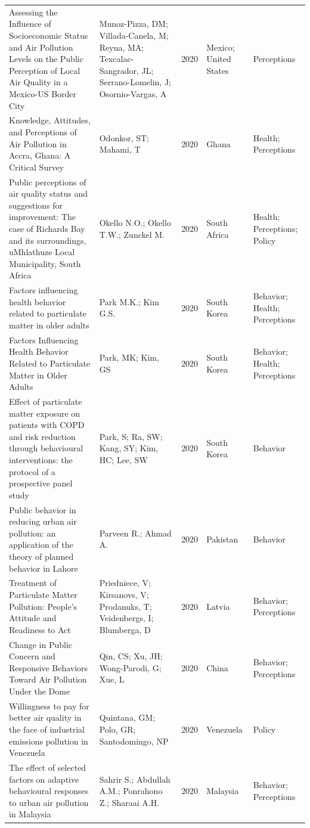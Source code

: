 {\begin{longtable}[t]{p{6cm}p{3cm}lp{3cm}p{3cm}}
Assessing the Influence of Socioeconomic Status and Air Pollution Levels on the Public Perception of Local Air Quality in a Mexico-US Border City & Munoz-Pizza, DM; Villada-Canela, M; Reyna, MA; Texcalac-Sangrador, JL; Serrano-Lomelin, J; Osornio-Vargas, A & 2020 & Mexico; United States & Perceptions\\
Knowledge, Attitudes, and Perceptions of Air Pollution in Accra, Ghana: A Critical Survey & Odonkor, ST; Mahami, T & 2020 & Ghana & Health; Perceptions\\
Public perceptions of air quality status and suggestions for improvement: The case of Richards Bay and its surroundings, uMhlathuze Local Municipality, South Africa & Okello N.O.; Okello T.W.; Zunckel M. & 2020 & South Africa & Health; Perceptions; Policy\\
Factors influencing health behavior related to particulate matter in older adults & Park M.K.; Kim G.S. & 2020 & South Korea & Behavior; Health; Perceptions\\
\addlinespace
Factors Influencing Health Behavior Related to Particulate Matter in Older Adults & Park, MK; Kim, GS & 2020 & South Korea & Behavior; Health; Perceptions\\
Effect of particulate matter exposure on patients with COPD and risk reduction through behavioural interventions: the protocol of a prospective panel study & Park, S; Ra, SW; Kang, SY; Kim, HC; Lee, SW & 2020 & South Korea & Behavior\\
Public behavior in reducing urban air pollution: an application of the theory of planned behavior in Lahore & Parveen R.; Ahmad A. & 2020 & Pakistan & Behavior\\
Treatment of Particulate Matter Pollution: People's Attitude and Readiness to Act & Priedniece, V; Kirsanovs, V; Prodanuks, T; Veidenbergs, I; Blumberga, D & 2020 & Latvia & Behavior; Perceptions\\
Change in Public Concern and Responsive Behaviors Toward Air Pollution Under the Dome & Qin, CS; Xu, JH; Wong-Parodi, G; Xue, L & 2020 & China & Behavior; Perceptions\\
\addlinespace
Willingness to pay for better air quality in the face of industrial emissions pollution in Venezuela & Quintana, GM; Polo, GR; Santodomingo, NP & 2020 & Venezuela & Policy\\
The effect of selected factors on adaptive behavioural responses to urban air pollution in Malaysia & Sahrir S.; Abdullah A.M.; Ponrahono Z.; Sharaai A.H. & 2020 & Malaysia & Behavior; Perceptions\\

\end{longtable}}
